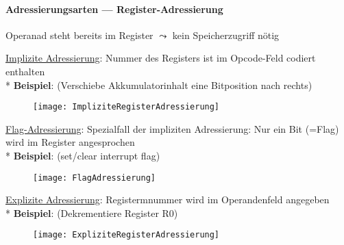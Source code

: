 \newpage

\paragraph{Adressierungsarten --- Register-Adressierung}
\begin{items}
	\item Operanad steht bereits im Register $\leadsto$ kein Speicherzugriff nötig
	\item \underline{Implizite Adressierung}: Nummer des Registers ist im Opcode-Feld codiert enthalten \\* \textbf{Beispiel}:  (Verschiebe Akkumulatorinhalt eine Bitposition nach rechts)
		\begin{figure}[H]
		  \centering
		  \texttt{[image: ImpliziteRegisterAdressierung]}
		  \label{ImpliziteRegisterAdressierung}
		\end{figure}
	\item \underline{Flag-Adressierung}: Spezialfall der impliziten Adressierung: Nur ein Bit (=Flag) wird im Register angesprochen \\* \textbf{Beispiel}:  (set/clear interrupt flag)
		\begin{figure}[H]
		  \centering
		  \texttt{[image: FlagAdressierung]}
		  \label{FlagAdressierung}
		\end{figure}
	\item \underline{Explizite Adressierung}: Registermnummer wird im Operandenfeld angegeben \\* \textbf{Beispiel}:  (Dekrementiere Register R0)
		\begin{figure}[H]
		  \centering
		  \texttt{[image: ExpliziteRegisterAdressierung]}
		  \label{ExpliziteRegisterAdressierung}
		\end{figure}
\end{items}

